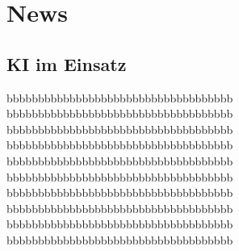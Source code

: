 \part{News}
\chapter{\ac{KI} im Einsatz}

bbbbbbbbbbbbbbbbbbbbbbbbbbbbbbbbbbbb
bbbbbbbbbbbbbbbbbbbbbbbbbbbbbbbbbbbb
bbbbbbbbbbbbbbbbbbbbbbbbbbbbbbbbbbbb
bbbbbbbbbbbbbbbbbbbbbbbbbbbbbbbbbbbb
bbbbbbbbbbbbbbbbbbbbbbbbbbbbbbbbbbbb
bbbbbbbbbbbbbbbbbbbbbbbbbbbbbbbbbbbb
bbbbbbbbbbbbbbbbbbbbbbbbbbbbbbbbbbbb
bbbbbbbbbbbbbbbbbbbbbbbbbbbbbbbbbbbb
bbbbbbbbbbbbbbbbbbbbbbbbbbbbbbbbbbbb
bbbbbbbbbbbbbbbbbbbbbbbbbbbbbbbbbbbb